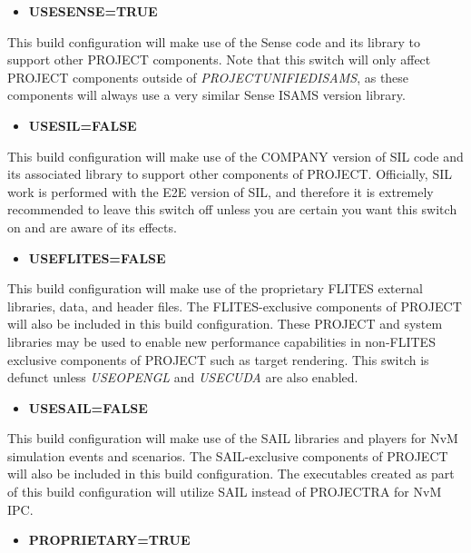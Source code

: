 \documentclass[12pt,letterpaper]{article}
\begin{document}
\begin{itemize}
\item \textbf{USESENSE=TRUE}
\end{itemize}

This build configuration will make use of the Sense code and its library to support other PROJECT components.  Note that this switch will only affect PROJECT components outside of \emph{PROJECTUNIFIEDISAMS}, as these components will always use a very similar Sense ISAMS version library.

\begin{itemize}
\item \textbf{USESIL=FALSE}
\end{itemize}

This build configuration will make use of the COMPANY version of SIL code and its associated library to support other components of PROJECT.  Officially, SIL work is performed with the E2E version of SIL, and therefore it is extremely recommended to leave this switch off unless you are certain you want this switch on and are aware of its effects.

\begin{itemize}
\item \textbf{USEFLITES=FALSE}
\end{itemize}

This build configuration will make use of the proprietary FLITES external libraries, data, and header files.  The FLITES-exclusive components of PROJECT will also be included in this build configuration.  These PROJECT and system libraries may be used to enable new performance capabilities in non-FLITES exclusive components of PROJECT such as target rendering.  This switch is defunct unless \emph{USEOPENGL} and \emph{USECUDA} are also enabled.

\begin{itemize}
\item \textbf{USESAIL=FALSE}
\end{itemize}

This build configuration will make use of the SAIL libraries and players for NvM simulation events and scenarios.  The SAIL-exclusive components of PROJECT will also be included in this build configuration.  The executables created as part of this build configuration will utilize SAIL instead of PROJECTRA for NvM IPC.

\begin{itemize}
\item \textbf{PROPRIETARY=TRUE}
\end{itemize}
\end{document}
